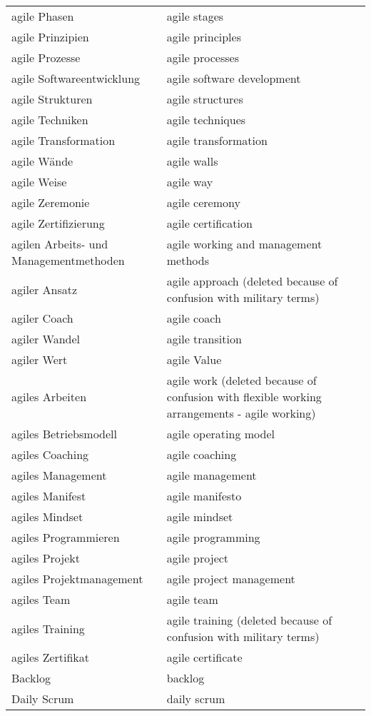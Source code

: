 \begin{spacing}{.5}
\begin{longtable}{ p{} p{}}
    agile Phasen & agile stages \\
    agile Prinzipien & agile principles \\
    agile Prozesse & agile processes \\
    agile Softwareentwicklung & agile software development \\
    agile Strukturen & agile structures \\
    agile Techniken & agile techniques \\
    agile Transformation & agile transformation \\
    agile Wände & agile walls \\
    agile Weise & agile way \\
    agile Zeremonie & agile ceremony \\
    agile Zertifizierung & agile certification \\
    agilen Arbeits- und Managementmethoden & agile working and management methods \\
    agiler Ansatz & agile approach (deleted because of confusion with military terms) \\
    agiler Coach & agile coach \\
    agiler Wandel & agile transition \\
    agiler Wert & agile Value \\
    agiles Arbeiten & agile work (deleted because of confusion with flexible working arrangements - agile working) \\
    agiles Betriebsmodell & agile operating model \\
    agiles Coaching & agile coaching \\
    agiles Management & agile management \\
    agiles Manifest & agile manifesto \\
    agiles Mindset & agile mindset \\
    agiles Programmieren & agile programming \\
    agiles Projekt & agile project \\
    agiles Projektmanagement & agile project management \\
    agiles Team & agile team \\
    agiles Training & agile training (deleted because of confusion with military terms) \\
    agiles Zertifikat & agile certificate \\
    Backlog & backlog \\
    Daily Scrum & daily scrum \\

\end{longtable}
\end{spacing}
